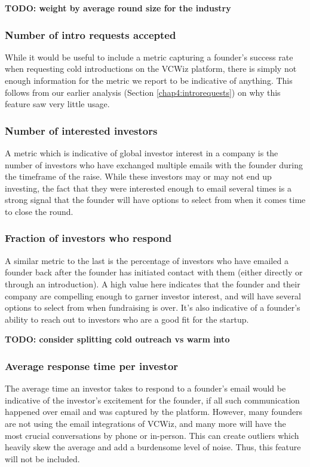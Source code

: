 \textbf{TODO: weight by average round size for the industry}

\subsubsection{Number of intro requests accepted}

While it would be useful to include a metric capturing a founder's success rate when requesting cold introductions on the VCWiz platform, there is simply not enough information for the metric we report to be indicative of anything. This follows from our earlier analysis (Section \ref{chap4:introrequests}) on why this feature saw very little usage.

\subsubsection{Number of interested investors}

A metric which is indicative of global investor interest in a company is the number of investors who have exchanged multiple emails with the founder during the timeframe of the raise. While these investors may or may not end up investing, the fact that they were interested enough to email several times is a strong signal that the founder will have options to select from when it comes time to close the round.

\subsubsection{Fraction of investors who respond}

A similar metric to the last is the percentage of investors who have emailed a founder back after the founder has initiated contact with them (either directly or through an introduction). A high value here indicates that the founder and their company are compelling enough to garner investor interest, and will have several options to select from when fundraising is over. It's also indicative of a founder's ability to reach out to investors who are a good fit for the startup.

\textbf{TODO: consider splitting cold outreach vs warm into}

\subsubsection{Average response time per investor}

The average time an investor takes to respond to a founder's email would be indicative of the investor's excitement for the founder, if all such communication happened over email and was captured by the platform. However, many founders are not using the email integrations of VCWiz, and many more will have the most crucial conversations by phone or in-person. This can create outliers which heavily skew the average and add a burdensome level of noise. Thus, this feature will not be included.


